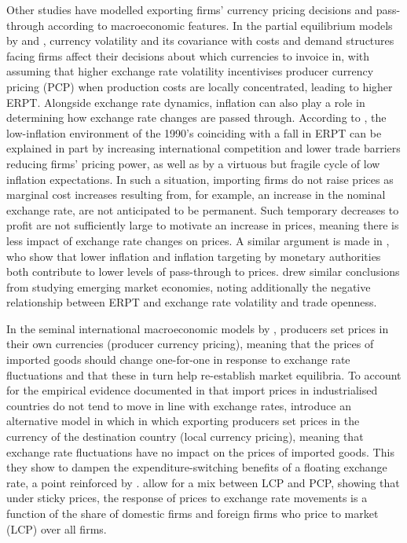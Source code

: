 \documentclass[12pt]{article}
\begin{document}
Other studies have modelled exporting firms’ currency pricing decisions and pass-through according to macroeconomic features. In the partial equilibrium models by \textcite{friberg1998currency} and \textcite{engel-2006}, currency volatility and its covariance with costs and demand structures facing firms affect their decisions about which currencies to invoice in, with \textcite{devereux2004endogenous} assuming that higher exchange rate volatility incentivises producer currency pricing (PCP) when production costs are locally concentrated, leading to higher ERPT. Alongside exchange rate dynamics, inflation can also play a role in determining how exchange rate changes are passed through. According to \textcite{taylor2000low}, the low-inflation environment of the 1990’s coinciding with a fall in ERPT can be explained in part by increasing international competition and lower trade barriers reducing firms’ pricing power, as well as by a virtuous but fragile cycle of low inflation expectations. In such a situation,  importing firms do not raise prices as marginal cost increases resulting from, for example, an increase in the nominal exchange rate, are not anticipated to be permanent. Such temporary decreases to profit are not sufficiently large to motivate an increase in prices, meaning there is less impact of exchange rate changes on prices. A similar argument is made in \textcite{gagnon2004monetary}, who show that lower inflation and inflation targeting by monetary authorities both contribute to lower levels of pass-through to prices. \textcite{ozkan2015time} drew similar conclusions from studying emerging market economies, noting additionally the negative relationship between ERPT and exchange rate volatility and trade openness. 

In the seminal international macroeconomic models by \textcite{obstfeld1995exchange, obstfeld1998risk}, producers set prices in their own currencies (producer currency pricing), meaning that the prices of imported goods should change one-for-one in response to exchange rate fluctuations and that these in turn help re-establish market equilibria. To account for the empirical evidence documented in \textcite{goldberg1997causes} that import prices in industrialised countries do not tend to move in line with exchange rates, \textcite{devereux2003monetary} introduce an alternative model in which in which exporting producers set prices in the currency of the destination country (local currency pricing), meaning that exchange rate fluctuations have no impact on the prices of imported goods. This they show to dampen the expenditure-switching benefits of a floating exchange rate, a point reinforced by \textcite{devereux2004endogenous}. \textcite{betts2000exchange} allow for a mix between LCP and PCP, showing that under sticky prices, the response of prices to exchange rate movements is a function of the share of domestic firms and foreign firms who price to market (LCP) over all firms. 
\end{document}
